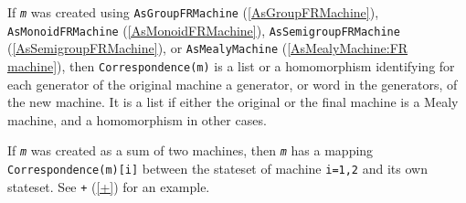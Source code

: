 \documentclass[a4paper,11pt]{report}
\begin{document}
{{{ If \mbox{\texttt{\mdseries\slshape m}} was created using \texttt{AsGroupFRMachine} (\ref{AsGroupFRMachine}), \texttt{AsMonoidFRMachine} (\ref{AsMonoidFRMachine}), \texttt{AsSemigroupFRMachine} (\ref{AsSemigroupFRMachine}), or \texttt{AsMealyMachine} (\ref{AsMealyMachine:FR machine}), then \texttt{Correspondence(m)} is a list or a homomorphism identifying for each generator of the original
machine a generator, or word in the generators, of the new machine. It is a
list if either the original or the final machine is a Mealy machine, and a
homomorphism in other cases. 

 If \mbox{\texttt{\mdseries\slshape m}} was created as a sum of two machines, then \mbox{\texttt{\mdseries\slshape m}} has a mapping \texttt{Correspondence(m)[i]} between the stateset of machine \texttt{i=1,2} and its own stateset. See \texttt{\texttt{}+} (\ref{+}) for an example. }

 }

 }

 
\end{document}
